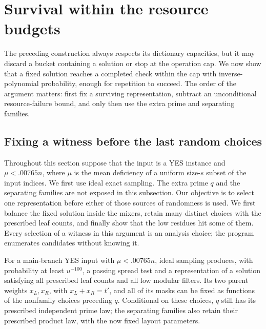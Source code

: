 \section{Survival within the resource budgets}\label{sec:survival}

The preceding construction always respects its dictionary capacities,
but it may discard a bucket containing a solution or stop at the
operation cap. We now show that a fixed solution reaches a completed
check within the cap with inverse-polynomial probability, enough for
repetition to succeed. The order of the argument matters: first fix a
surviving representation, subtract an unconditional resource-failure
bound, and only then use the extra prime and separating families.

\subsection{Fixing a witness before the last random choices}

Throughout this section suppose that the input is a YES instance and
\(\mu<.00765n\), where \(\mu\) is the mean deficiency of a uniform
size-\(s\) subset of the input indices. We first use ideal exact sampling.
The extra prime \(q\) and the separating families are not exposed in this
subsection. Our objective is to select one representation before either
of those sources of randomness is used. We first balance the fixed
solution inside the mixers, retain many distinct choices with the
prescribed leaf counts, and finally show that the low residues hit
some of them. Every selection of a witness in this argument is an
analysis choice; the program enumerates candidates without knowing it.

\begin{lemma}\label{lem:representation}
For a main-branch YES input with \(\mu<.00765n\), ideal sampling
produces, with probability at least \(u^{-100}\), a passing spread test and a representation of a solution satisfying all prescribed leaf
counts and all low modular filters. Its two parent weights
\(x_L,x_R\), with \(x_L+x_R=t'\), and all of its masks can be fixed as
functions of the nonfamily choices preceding \(q\). Conditional on
these choices, \(q\) still has its prescribed independent prime law;
the separating families also retain their prescribed product law,
with the now fixed layout parameters.
\end{lemma}

